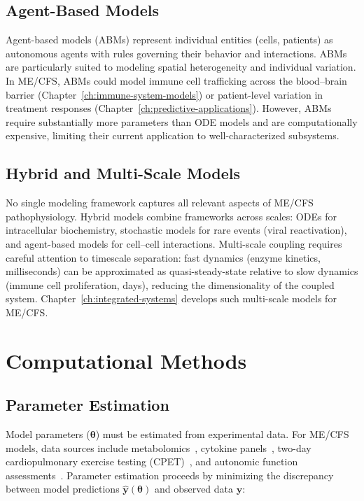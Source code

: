 \subsection{Agent-Based Models}

Agent-based models (ABMs) represent individual entities (cells, patients) as autonomous agents with rules governing their behavior and interactions. ABMs are particularly suited to modeling spatial heterogeneity and individual variation. In ME/CFS, ABMs could model immune cell trafficking across the blood--brain barrier (Chapter~\ref{ch:immune-system-models}) or patient-level variation in treatment responses (Chapter~\ref{ch:predictive-applications}). However, ABMs require substantially more parameters than ODE models and are computationally expensive, limiting their current application to well-characterized subsystems.

\subsection{Hybrid and Multi-Scale Models}

No single modeling framework captures all relevant aspects of ME/CFS pathophysiology. Hybrid models combine frameworks across scales: ODEs for intracellular biochemistry, stochastic models for rare events (viral reactivation), and agent-based models for cell--cell interactions. Multi-scale coupling requires careful attention to timescale separation: fast dynamics (enzyme kinetics, milliseconds) can be approximated as quasi-steady-state relative to slow dynamics (immune cell proliferation, days), reducing the dimensionality of the coupled system. Chapter~\ref{ch:integrated-systems} develops such multi-scale models for ME/CFS.

\section{Computational Methods}
\label{sec:computational-methods}

\subsection{Parameter Estimation}

Model parameters ($\boldsymbol{\theta}$) must be estimated from experimental data. For ME/CFS models, data sources include metabolomics~\cite{Naviaux2016metabolomics,Germain2020metabolic}, cytokine panels~\cite{Hornig2015,Montoya2017}, two-day cardiopulmonary exercise testing (CPET)~\cite{keller2024cpet}, and autonomic function assessments~\cite{Newton2007}. Parameter estimation proceeds by minimizing the discrepancy between model predictions $\hat{\mathbf{y}}(\boldsymbol{\theta})$ and observed data $\mathbf{y}$:

